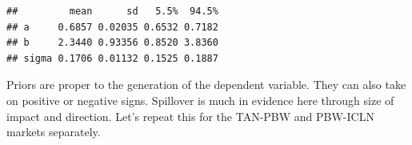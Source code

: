 \documentclass{article}
\newenvironment{Shaded}{\begin{snugshade}}{\end{snugshade}}
\newcommand{\AttributeTok}[1]{\textcolor[rgb]{0.77,0.63,0.00}{#1}}
\newcommand{\DecValTok}[1]{\textcolor[rgb]{0.00,0.00,0.81}{#1}}
\newcommand{\FunctionTok}[1]{\textcolor[rgb]{0.00,0.00,0.00}{#1}}
\newcommand{\NormalTok}[1]{#1}
\newcommand{\OtherTok}[1]{\textcolor[rgb]{0.56,0.35,0.01}{#1}}
\newcommand{\SpecialCharTok}[1]{\textcolor[rgb]{0.00,0.00,0.00}{#1}}
\begin{document}
\begin{Shaded}
\end{Shaded}

\begin{verbatim}
##         mean      sd   5.5%  94.5%
## a     0.6857 0.02035 0.6532 0.7182
## b     2.3440 0.93356 0.8520 3.8360
## sigma 0.1706 0.01132 0.1525 0.1887
\end{verbatim}

Priors are proper to the generation of the dependent variable. They can
also take on positive or negative signs. Spillover is much in evidence
here through size of impact and direction. Let's repeat this for the
TAN-PBW and PBW-ICLN markets separately.
\end{document}
